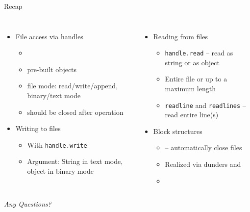 
\begin{frame}[t,plain]
\titlepage
\end{frame}


\begin{frame}{Recap}
%
\begin{columns}[T]
\begin{itemize}
\item File access via handles
	\begin{itemize}
	\item {}
	\item pre-built objects
	\item file mode: read/write/append, binary/text mode
	\item should be closed after operation
	\end{itemize}
\item Writing to files
	\begin{itemize}
	\item With \texttt{handle.write}
	\item Argument: String in text mode,  object in binary mode
	\end{itemize}
\end{itemize}
%
\begin{itemize}
\item Reading from files
	\begin{itemize}
	\item \texttt{handle.read} -- read as string or as  object
	\item Entire file or up to a maximum length
	\item \texttt{readline} and \texttt{readlines} -- read entire line(s)
	\end{itemize}
\item Block structures
	\begin{itemize}
	\item {} -- automatically close files
	\item Realized via dunders  and 
	\item {}
	\end{itemize}
\end{itemize}
\end{columns}
%
\begin{center}
	\emph{Any Questions?}
\end{center}
%
\end{frame}


